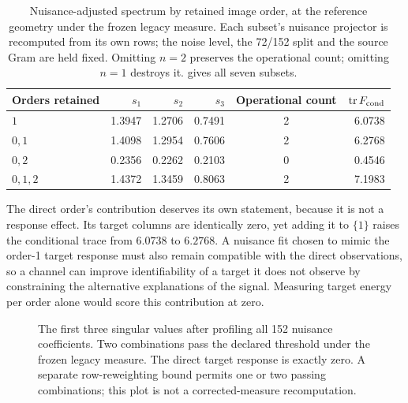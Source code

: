 \begin{table}[htbp]
\centering\small
\caption{Nuisance-adjusted spectrum by retained image order, at the reference
geometry under the frozen legacy measure. Each subset's nuisance projector is
recomputed from its own rows; the noise level, the 72/152 split and the source
Gram are held fixed. Omitting $n=2$ preserves the operational count; omitting
$n=1$ destroys it.  gives all seven subsets.}
\label{tab:orderattr}
\begin{tabular}{l r r r c r}
\toprule
Orders retained&$s_1$&$s_2$&$s_3$&Operational count&$\operatorname{tr} F_{\rm cond}$\\
\midrule
$1$&1.3947&1.2706&0.7491&2&6.0738\\
$0,1$&1.4098&1.2954&0.7606&2&6.2768\\
$0,2$&0.2356&0.2262&0.2103&0&0.4546\\
$0,1,2$&1.4372&1.3459&0.8063&2&7.1983\\
\bottomrule
\end{tabular}
\end{table}

The direct order's contribution deserves its own statement, because it is not
a response effect. Its target columns are identically zero, yet adding it to
$\{1\}$ raises the conditional trace from $6.0738$ to $6.2768$. A nuisance fit
chosen to mimic the order-1 target response must also remain compatible with
the direct observations, so a channel can improve identifiability of a target
it does not observe by constraining the alternative explanations of the
signal. Measuring target energy per order alone would score this contribution
at zero.

\begin{figure}[htbp]
\centering
{}
\caption{The first three singular values after profiling all 152 nuisance coefficients. Two combinations pass the declared threshold under the frozen legacy measure. The direct target response is exactly zero. A separate row-reweighting bound permits one or two passing combinations; this plot is not a corrected-measure recomputation.}
\label{fig:r2}
\end{figure}

